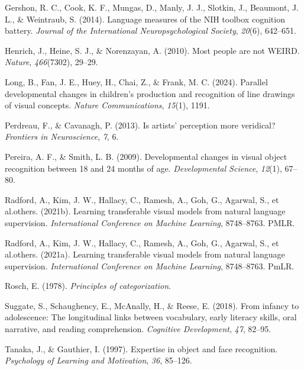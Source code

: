 \documentclass[
  man,mask]{apa6}
\newlength{\cslhangindent}
\newenvironment{CSLReferences}[2] %
 {\begin{list}{}{%
  \setlength{\itemindent}{0pt}
  \setlength{\leftmargin}{0pt}
  \setlength{\parsep}{0pt}
  \ifodd #1
   \setlength{\leftmargin}{\cslhangindent}
   \setlength{\itemindent}{-1\cslhangindent}
  \fi
  \setlength{\itemsep}{#2\baselineskip}}}
 {\end{list}}
\begin{document}
\begin{CSLReferences}{1}{0}
Gershon, R. C., Cook, K. F., Mungas, D., Manly, J. J., Slotkin, J., Beaumont, J. L., \& Weintraub, S. (2014). Language measures of the NIH toolbox cognition battery. \emph{Journal of the International Neuropsychological Society}, \emph{20}(6), 642--651.

Henrich, J., Heine, S. J., \& Norenzayan, A. (2010). Most people are not WEIRD. \emph{Nature}, \emph{466}(7302), 29--29.

Long, B., Fan, J. E., Huey, H., Chai, Z., \& Frank, M. C. (2024). Parallel developmental changes in children's production and recognition of line drawings of visual concepts. \emph{Nature Communications}, \emph{15}(1), 1191.

Perdreau, F., \& Cavanagh, P. (2013). Is artists' perception more veridical? \emph{Frontiers in Neuroscience}, \emph{7}, 6.

Pereira, A. F., \& Smith, L. B. (2009). Developmental changes in visual object recognition between 18 and 24 months of age. \emph{Developmental Science}, \emph{12}(1), 67--80.

Radford, A., Kim, J. W., Hallacy, C., Ramesh, A., Goh, G., Agarwal, S., et al.others. (2021b). Learning transferable visual models from natural language supervision. \emph{International Conference on Machine Learning}, 8748--8763. PMLR.

Radford, A., Kim, J. W., Hallacy, C., Ramesh, A., Goh, G., Agarwal, S., et al.others. (2021a). Learning transferable visual models from natural language supervision. \emph{International Conference on Machine Learning}, 8748--8763. PmLR.

Rosch, E. (1978). \emph{Principles of categorization}.

Suggate, S., Schaughency, E., McAnally, H., \& Reese, E. (2018). From infancy to adolescence: The longitudinal links between vocabulary, early literacy skills, oral narrative, and reading comprehension. \emph{Cognitive Development}, \emph{47}, 82--95.

Tanaka, J., \& Gauthier, I. (1997). Expertise in object and face recognition. \emph{Psychology of Learning and Motivation}, \emph{36}, 85--126.


\end{CSLReferences}
\end{document}
